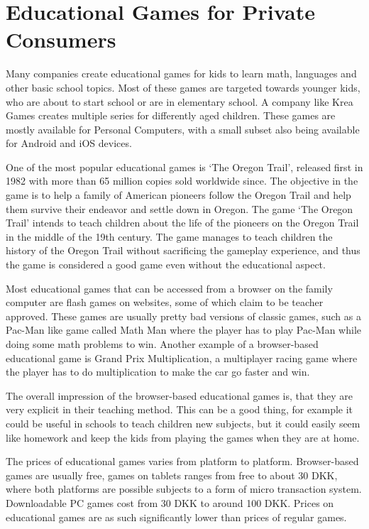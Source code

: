 \section{Educational Games for Private Consumers}
\label{sec:privateconsumers}
Many companies create educational games for kids to learn math, languages and other basic school topics. Most of these games are targeted towards younger kids, who are about to start school or are in elementary school. A company like Krea Games \cite{kreagames} creates multiple series for differently aged children. These games are mostly available for Personal Computers, with a small subset also being available for Android and iOS devices.

One of the most popular educational games is `The Oregon Trail', released first in 1982 with more than 65 million copies sold worldwide since.\cite{oregontrail} The objective in the game is to help a family of American pioneers follow the Oregon Trail and help them survive their endeavor and settle down in Oregon.
The game `The Oregon Trail' intends to teach children about the life of the pioneers on the Oregon Trail in the middle of the 19th century. The game manages to teach children the history of the Oregon Trail without sacrificing the gameplay experience, and thus the game is considered a good game even without the educational aspect.

Most educational games that can be accessed from a browser on the family computer are flash games on websites, some of which claim to be teacher approved. These games are usually pretty bad versions of classic games, such as a Pac-Man like game called Math Man where the player has to play Pac-Man while doing some math problems to win.\cite{mathman} Another example of a browser-based educational game is Grand Prix Multiplication, a multiplayer racing game where the player has to do multiplication to make the car go faster and win.\cite{grandprix}

The overall impression of the browser-based educational games is, that they are very explicit in their teaching method. This can be a good thing, for example it could be useful in schools to teach children new subjects, but it could easily seem like homework and keep the kids from playing the games when they are at home.

The prices of educational games varies from platform to platform. Browser-based games are usually free, games on tablets ranges from free to about 30 DKK, where both platforms are possible subjects to a form of micro transaction system. Downloadable PC games cost from 30 DKK to around 100 DKK. Prices on educational games are as such significantly lower than prices of regular games.